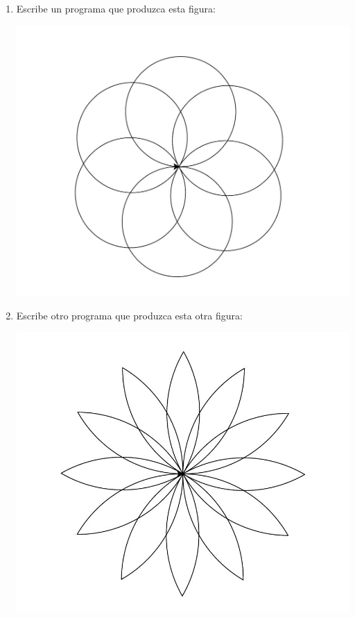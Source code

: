 \begin{appendices}
\begin{enumerate}
 \item Escribe un programa que produzca esta figura:
 
 
 \begin{center}
  \includegraphics[scale=0.2]{imagenes/circulos}
 \end{center}

 \item Escribe otro programa que produzca esta otra figura:
 
 
 \begin{center}
  \includegraphics[scale=0.2]{imagenes/flor}
 \end{center}


\end{enumerate}
\end{appendices}

